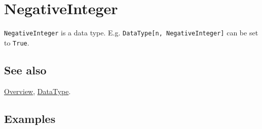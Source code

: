 \documentclass[../FeynCalcManual.tex]{subfiles}
\begin{document}
\hypertarget{negativeinteger}{
\section{NegativeInteger}\label{negativeinteger}}

\texttt{NegativeInteger} is a data type. E.g.
\texttt{DataType[\allowbreak{}n,\ \allowbreak{}NegativeInteger]} can be
set to \texttt{True}.

\subsection{See also}

\hyperlink{toc}{Overview}, \hyperlink{datatype}{DataType}.

\subsection{Examples}
\end{document}
